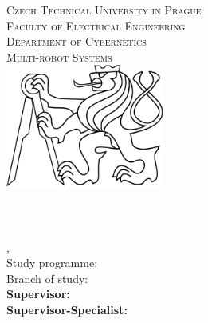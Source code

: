 \begin{titlepage}
  \begin{center}

    \textsc{\Large Czech Technical University in Prague}\\[1em]
    \textsc{\large Faculty of Electrical Engineering\\
    Department of Cybernetics\\
    Multi-robot Systems\\[3em]
    }
    \includegraphics[height=4.1cm]{fig/ctu_lion.pdf}\\[3em]

    \textbf{\textsc{\Huge \Title}}\\[2em]

    \textbf{\Large \DocName}\\[6em]

    \textbf{\huge \Author}\\[6em]

    {\large \Location, \Date}\\[3em]

    Study programme: \Programme\\
    Branch of study: \Field\\[2em]

    \textbf{Supervisor: \Supervisor}\\
    \textbf{Supervisor-Specialist: \SupervisorSpecialist}

    \vspace{2pt}

  \end{center}
\end{titlepage}
